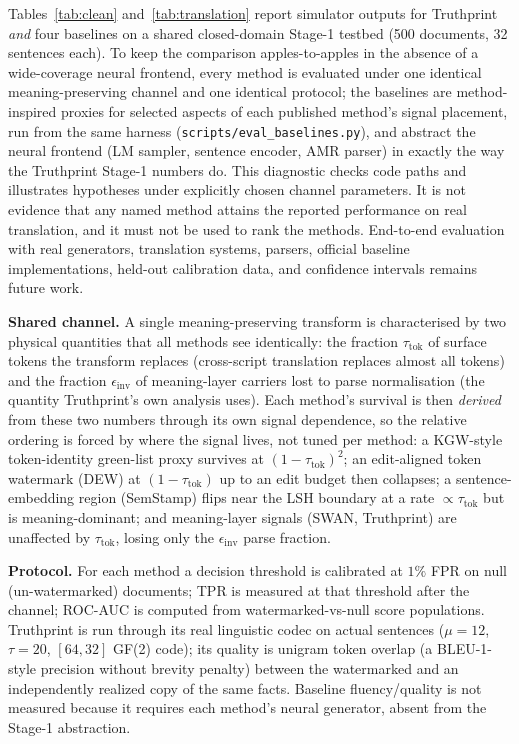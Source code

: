 \documentclass[journal]{IEEEtran}
\begin{document}
Tables~\ref{tab:clean} and~\ref{tab:translation} report simulator outputs for
Truthprint \emph{and} four baselines on a shared closed-domain Stage-1
testbed (500 documents, 32 sentences each). To keep the comparison
apples-to-apples in the absence of a wide-coverage neural frontend, every
method is evaluated under one identical meaning-preserving channel and one
identical protocol; the baselines are method-inspired proxies for selected aspects of each published
method's signal placement, run from the
same harness (\texttt{scripts/eval\_baselines.py}), and abstract the neural
frontend (LM sampler, sentence encoder, AMR parser) in exactly the way the
Truthprint Stage-1 numbers do. This diagnostic checks code paths and illustrates hypotheses under explicitly
chosen channel parameters. It is not evidence that any named method attains the
reported performance on real translation, and it must not be used to rank the
methods. End-to-end evaluation with real generators, translation systems,
parsers, official baseline implementations, held-out calibration data, and
confidence intervals remains future work.

\textbf{Shared channel.} A single meaning-preserving transform is
characterised by two physical quantities that all methods see identically:
the fraction $\tau_{\mathrm{tok}}$ of surface tokens the transform replaces
(cross-script translation replaces almost all tokens) and the fraction
$\epsilon_{\mathrm{inv}}$ of meaning-layer carriers lost to parse
normalisation (the quantity Truthprint's own analysis uses). Each method's
survival is then \emph{derived} from these two numbers through its own signal
dependence, so the relative ordering is forced by where the signal lives, not
tuned per method: a KGW-style token-identity green-list proxy survives at
$(1-\tau_{\mathrm{tok}})^2$; an edit-aligned token watermark (DEW) at
$(1-\tau_{\mathrm{tok}})$ up to an edit budget then collapses; a
sentence-embedding region (SemStamp) flips near the LSH boundary at a rate
$\propto\tau_{\mathrm{tok}}$ but is meaning-dominant; and meaning-layer
signals (SWAN, Truthprint) are unaffected by $\tau_{\mathrm{tok}}$, losing
only the $\epsilon_{\mathrm{inv}}$ parse fraction.

\textbf{Protocol.} For each method a decision threshold is calibrated at
$1\%$ FPR on null (un-watermarked) documents; TPR is measured at that
threshold after the channel; ROC-AUC is computed from watermarked-vs-null
score populations. Truthprint is run through its real linguistic codec on
actual sentences ($\mu=12$, $\tau=20$, $[64,32]$ GF(2) code); its quality is
unigram token overlap (a BLEU-1-style precision without brevity penalty)
between the watermarked and an independently realized copy of the same facts. Baseline fluency/quality is not measured because it requires each
method's neural generator, absent from the Stage-1 abstraction.
\end{document}
